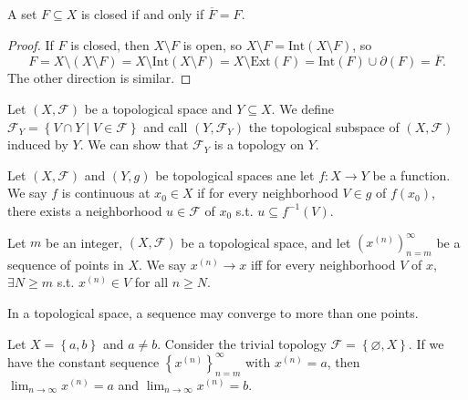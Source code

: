 \begin{corollary}
    A set \(F \subseteq X\) is closed if and only if \(\overline{F} = F\).
\end{corollary}
\begin{proof}
    If \(F\) is closed, then \(X \setminus F\) is open, so \(X \setminus F = \mathrm{Int}(X \setminus F) \), so 
    \[
        F = X \setminus (X \setminus F) = X \setminus \mathrm{Int}(X \setminus F) = X \setminus \mathrm{Ext}(F) = \mathrm{Int}(F) \cup \partial (F) = \overline{F}.    
    \] 
    The other direction is similar.  
\end{proof}

\begin{definition}
    Let \((X, \mathcal{F} )\)  be a topological space and \(Y \subseteq X\). We define \(\mathcal{F} _Y = \left\{ V \cap Y \mid V \in \mathcal{F}  \right\} \) and call \((Y, \mathcal{F} _Y)\) the topological subspace of \((X, \mathcal{F} )\) induced by \(Y\). We can show that \(\mathcal{F} _Y\) is a topology on \(Y\).       
\end{definition}

\begin{definition}
    Let \((X, \mathcal{F} )\) and \((Y, g)\) be topological spaces ane let \(f:X \to  Y\) be a function. We say \(f\) is continuous at \(x_0 \in X\) if for every neighborhood \(V \in g\) of \(f(x_0)\), there exists a neighborhood \(u \in \mathcal{F} \) of \(x_0\) s.t. \(u \subseteq f^{-1}(V)\).          
\end{definition}

\begin{definition}[Convergence]
    Let \(m\) be an integer, \((X, \mathcal{F} )\) be a topological space, and let \(\left( x^{(n)} \right)_{n=m}^{\infty}  \) be a sequence of points in \(X\). We say \(x^{(n)} \to x\) iff for every neighborhood \(V\) of \(x\), \(\exists N \ge m\) s.t. \(x^{(n)} \in V\) for all \(n \ge N\).          
\end{definition}

\begin{remark}
    In a topological space, a sequence may converge to more than one points. 
\end{remark}

\begin{eg}
    Let \(X = \left\{ a, b \right\} \) and \(a \neq b\). Consider the trivial topology \(\mathcal{F} = \left\{ \varnothing , X \right\} \). If we have the constant sequence \(\left\{ x^{(n)} \right\}_{n=m}^{\infty}  \) with \(x^{(n)} = a\), then \(\lim_{n \to \infty} x^{(n)} = a \) and \(\lim_{n \to \infty} x^{(n)} = b \).      
\end{eg}

